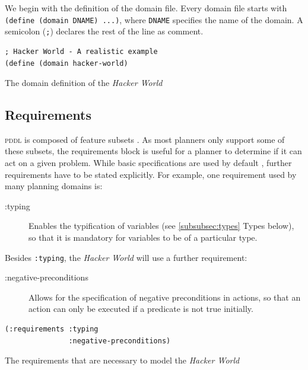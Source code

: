\documentclass[a4paper,12pt]{report}
\newcommand{\pddl}{\textsc{pddl}\xspace}
\begin{document}
We begin with the definition of the domain file. Every domain file
starts with \texttt{(define (domain DNAME) ...)}, where \texttt{DNAME} specifies the
name of the domain. A semicolon (\texttt{;}) declares the rest of the line as
comment.

\begin{listing}[H]
\begin{verbatim}
; Hacker World - A realistic example
(define (domain hacker-world)
\end{verbatim}
\caption{The domain definition of the \emph{Hacker World}}
\end{listing}
\subsection{Requirements}
\label{sec-2-2-2}

\pddl is composed of feature subsets \cite{mcdermott1998pddl}.
As most planners only support some of these subsets, the requirements
block is useful for a planner to determine if it can act on a given
problem. While basic specifications are used by default
\cite{mcdermott1998pddl}, further requirements have to be stated
explicitly. For example, one requirement used by many planning domains
\cite{wickler2011using} is:

\begin{description}
\item[{:typing}] Enables the typification of variables (see
\ref{subsubsec:types} Types below), so that it is mandatory for
variables to be of a particular type.
\end{description}

Besides \texttt{:typing}, the \emph{Hacker World} will use a further
requirement:

\begin{description}
\item[{:negative-preconditions}] Allows for the specification of negative
preconditions in actions, so that an action can only be executed
if a predicate is not true initially.
\end{description}

\begin{listing}[H]
\begin{verbatim}
(:requirements :typing
               :negative-preconditions)
\end{verbatim}
\caption{The requirements that are necessary to model the \emph{Hacker World}}
\end{listing}
\end{document}
